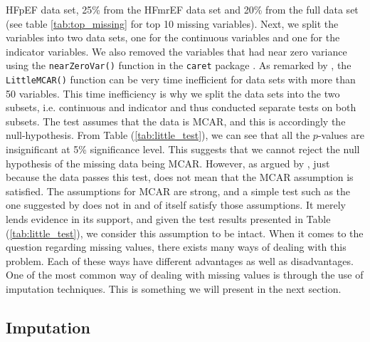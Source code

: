\documentclass[../thesis.tex]{subfiles}
\begin{document}
 

\noindent HFpEF data set, 25\% from the HFmrEF data set and 20\% from the full data set (see table \ref{tab:top_missing} for top 10 missing variables). Next, we split the variables into two data sets, one for the continuous variables and one for the indicator variables. We also removed the variables that had near zero variance using the \texttt{nearZeroVar()} function in the \texttt{caret} package \citep{kuhncaret}. As remarked by \cite{BaylorEdPsych}, the \texttt{LittleMCAR()} function can be very time inefficient for data sets with more than 50 variables. This time inefficiency is why we split the data sets into the two subsets, i.e. continuous and indicator and thus conducted separate tests on both subsets. The test assumes that the data is MCAR, and this is accordingly the null-hypothesis. From Table (\ref{tab:little_test}), we can see that all the $p$-values are insignificant at 5\% significance level. This suggests that we cannot reject the null hypothesis of the missing data  
\noindent being MCAR. However, as argued by \cite{allison1999missing}, just because the data passes this test, does not mean that the MCAR assumption is satisfied. The assumptions for MCAR are strong, and a simple test such as the one suggested by \cite{little1988test} does not in and of itself satisfy those assumptions. It merely lends evidence in its support, and given the test results presented in Table (\ref{tab:little_test}), we consider this assumption to be intact. When it comes to the question regarding missing values, there exists many ways of dealing with this problem. Each of these ways have different advantages as well as disadvantages. One of the most common way of dealing with missing values is through the use of imputation techniques. This is something we will present in the next section.

\vspace*{-0,5cm}\subsection{Imputation}
\label{subsec:impu}
\end{document}
